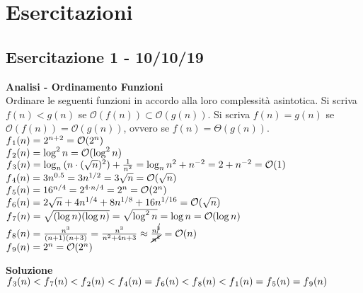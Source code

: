 \documentclass[../cheatSheetAlgoritmi.tex]{subfiles}
\begin{document}
\section{Esercitazioni} 
\subsection{Esercitazione 1 - 10/10/19}
\textbf{Analisi - Ordinamento Funzioni}\\
Ordinare le seguenti funzioni in accordo alla loro complessità asintotica. Si scriva $f(n) < g(n)$ se $\mathcal{O}(f(n)) \subset \mathcal{O}(g(n))$. Si scriva $f(n) = g(n)$ se $\mathcal{O}(f(n)) = \mathcal{O}(g(n))$, ovvero se $f(n) = \Theta(g(n))$.\\
$f\textsubscript{1}(n) = 2^{n+2} = \mathcal{O}(2^{n})$\\
$f\textsubscript{2}(n) = \log^{2}{n} = \mathcal{O}(\log^{2}{n})$\\
$f\textsubscript{3}(n) = \log_{n}{(n \cdot (\sqrt{n})^{2})} + \frac{1}{n^{2}} = \log_{n}{n^{2}} + {n^{-2}} = 2 + {n^{-2}} = \mathcal{O}(1)$\\
$f\textsubscript{4}(n) = 3n^{0.5} = 3n^{1/2} = 3 \sqrt{n} = \mathcal{O}(\sqrt{n})$\\
$f\textsubscript{5}(n) = 16^{n/4} = 2^{4 \cdot n/4} = 2^{n} = \mathcal{O}(2^{n})$\\
$f\textsubscript{6}(n) =2 \sqrt{n} + 4n^{1/4} + 8n^{1/8} + 16n^{1/16} = \mathcal{O}(\sqrt{n})$\\
$f\textsubscript{7}(n) = \sqrt{(\log{n})(\log{n})} = \sqrt{\log^{2}{n}} = \log{n} = \mathcal{O}(\log{n})$\\
$f\textsubscript{8}(n) = \frac{n^3}{(n+1)(n+3)} = \frac{n^3}{n^{2} + 4n + 3} \approx \frac{n^{\cancel{3}}}{\cancel{n^{2}}} = \mathcal{O}(n)$\\
$f\textsubscript{9}(n) = 2^{n} = \mathcal{O}(2^{n})$

\bigskip
\textbf{Soluzione}\\
$f\textsubscript{3}(n) < f\textsubscript{7}(n) < f\textsubscript{2}(n) < f\textsubscript{4}(n) = f\textsubscript{6}(n) < f\textsubscript{8}(n) < f\textsubscript{1}(n) = f\textsubscript{5}(n) = f\textsubscript{9}(n)$
\end{document}
